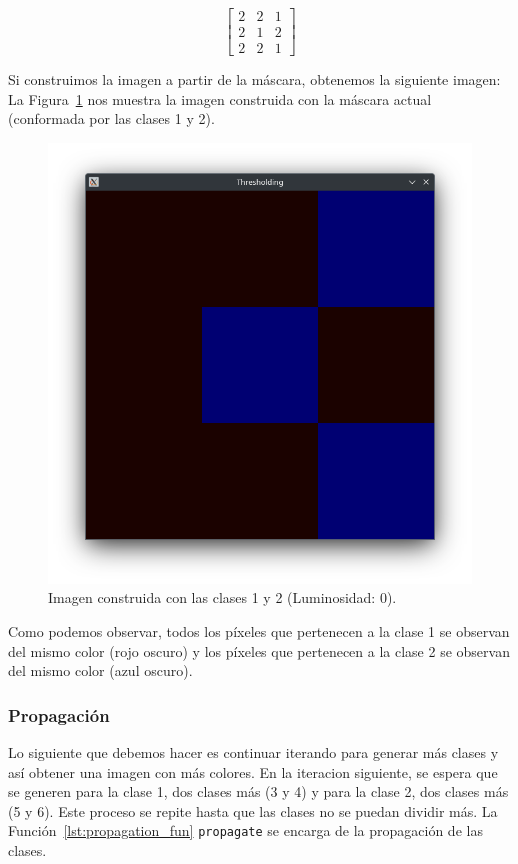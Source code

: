 \begin{equation*}
    \begin{bmatrix}
        2 & 2 & 1 \\
        2 & 1 & 2 \\
        2 & 2 & 1
    \end{bmatrix}
\end{equation*}

Si construimos la imagen a partir de la máscara, obtenemos la siguiente imagen:
La Figura~\ref{fig:m1} nos muestra la imagen construida con la máscara actual (conformada por las clases 1 y 2).

\begin{figure}[H]
    \centering
    \includegraphics[width=.35\textwidth]{./latex/img/m1}
    \caption{Imagen construida con las clases 1 y 2 (Luminosidad: 0).}
    \label{fig:m1}
\end{figure}

Como podemos observar, todos los píxeles que pertenecen a la clase 1 se observan del mismo color (rojo oscuro) y los píxeles que pertenecen a la clase 2 se observan del mismo color (azul oscuro).

\subsubsection{Propagación}\label{subsubsec:propagation}

Lo siguiente que debemos hacer es continuar iterando para generar más clases y así obtener una imagen con más colores.
En la iteracion siguiente, se espera que se generen para la clase 1, dos clases más (3 y 4) y para la clase 2, dos clases más (5 y 6).
Este proceso se repite hasta que las clases no se puedan dividir más.
La Función~\ref{lst:propagation_fun} \texttt{propagate} se encarga de la propagación de las clases.

